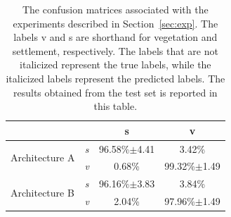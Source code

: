 \documentclass{article}
\begin{document}
\label{sec:results}
\begin{table}
\begin{tabular}{ |l|c c c| }
\hline
& & s & v\\
\hline
\multirow{2}{*}{Architecture A} & \emph{s} & 96.58\%$\pm$4.41&3.42\%\\
& \emph{v}& 0.68\%& 99.32\%$\pm$1.49\\
\hline
\multirow{2}{*}{Architecture B} & \emph{s} & 96.16\%$\pm$3.83&3.84\%\\
& \emph{v}& 2.04\%& 97.96\%$\pm$1.49\\
\hline
\end{tabular}
\caption{The confusion matrices associated with the experiments described in Section~\ref{sec:exp}. The labels v and s are shorthand for vegetation and settlement, respectively. The labels that are not italicized represent the true labels, while the italicized labels represent the predicted labels. The results obtained from the test set is reported in this table.}
\label{tab:cm}
\end{table}

\end{document}
